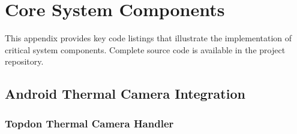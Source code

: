 \section{Core System Components}

This appendix provides key code listings that illustrate the implementation of critical system components. Complete source code is available in the project repository.

\subsection{Android Thermal Camera Integration}

\subsubsection{Topdon Thermal Camera Handler}

